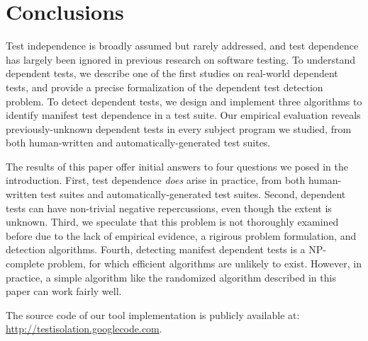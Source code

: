 \section{Conclusions}
\label{sec:questions}

Test independence is broadly assumed but rarely addressed, and
test dependence has largely been ignored in previous
research on software testing. To understand
dependent tests, we describe one of the first studies on
real-world dependent tests, and
provide a precise formalization of the dependent test detection
problem. To detect dependent tests, we design
and implement three algorithms to identify manifest test dependence
in a test suite. Our empirical evaluation reveals
previously-unknown dependent tests in every subject program
we studied, from both human-written and automatically-generated test
suites.

The results of this paper offer initial answers to four questions we posed
in the introduction. First, test dependence \textit{does}
arise in practice, from both human-written test suites and automatically-generated
test suites. Second, dependent tests can have
non-trivial negative repercussions, even though the
extent is unknown. Third, we speculate that this
problem is not thoroughly examined before due to the
lack of empirical evidence, a rigirous problem formulation,
and detection algorithms.
Fourth,
detecting manifest dependent tests is a NP-complete problem,
for which efficient algorithms are unlikely to exist. However,
in practice, a simple algorithm like the randomized algorithm
described in this paper can work fairly well.

The source code of our tool implementation is publicly
available at: \url{http://testisolation.googlecode.com}.
